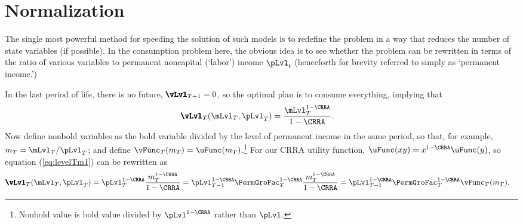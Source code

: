 \documentclass[titlepage, headings=optiontotocandhead]{\econtex}
\begin{document}
\hypertarget{Normalization}{}
\section{Normalization}\label{sec:normalization}
 The single most powerful method for speeding
the solution of such models is to redefine
the problem in a way that reduces the number of state variables (if
possible).  In the consumption problem here, the obvious idea is to see 
whether the problem can be rewritten in terms of the ratio of various
variables to permanent noncapital (`labor') income $\pLvl_{t}$ (henceforth
for brevity referred to simply as `permanent income.')


In the last period of life, there is no
future, ${\pmb{\vLvl}}
_{T+1} = 0$, so
the optimal plan is to consume everything, implying that
\begin{equation}\begin{gathered}\begin{aligned}
      {\pmb{\vLvl}}
_{T}(\mLvl_{T},\pLvl_{T})  & = \frac{\mLvl_{T}^{1-\CRRA}}{1-\CRRA}. \label{eq:levelTm1}
    \end{aligned}\end{gathered}\end{equation}
Now define nonbold variables as the bold variable divided by
the level of permanent income in the same period, so that, for
example, ${m}_{T}=\mLvl_{T}/\pLvl_{T}$; and define
$\vFunc_{T}({m}_{T}) = \uFunc({m}_{T})$.\footnote{Nonbold value is bold value divided by $\pLvl^{1-\CRRA}$ rather than $\pLvl$.}  For our CRRA utility function, $\uFunc(xy)=x^{1-\CRRA}\uFunc(y)$, so equation (\ref{eq:levelTm1}) can be
rewritten as
\begin{equation*}\begin{gathered}\begin{aligned}
      {\pmb{\vLvl}}
_{T}(\mLvl_{T},\pLvl_{T})  & = \pLvl_{T}^{1-\CRRA}\frac{{m}_{T}^{1-\CRRA}}{1-\CRRA} = \pLvl_{T-1}^{1-\CRRA}\PermGroFac_{T}^{1-\CRRA}\frac{{m}_{T}^{1-\CRRA}}{1-\CRRA}  = \pLvl_{T-1}^{1-\CRRA}\PermGroFac_{T}^{1-\CRRA}\vFunc_{T}({m}_{T}).
    \end{aligned}\end{gathered}\end{equation*}
\end{document}
